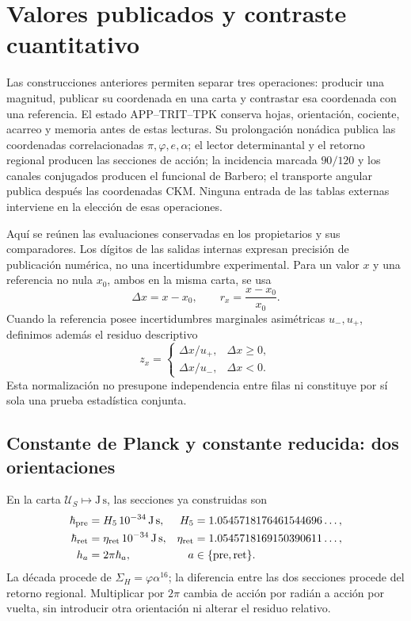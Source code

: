 \section{Valores publicados y contraste cuantitativo}
\label{sec:ii-contraste-cuantitativo}

Las construcciones anteriores permiten separar tres operaciones:
producir una magnitud, publicar su coordenada en una carta y contrastar esa
coordenada con una referencia. El estado APP--TRIT--TPK conserva hojas,
orientación, cociente, acarreo y memoria antes de estas lecturas. Su
prolongación nonádica publica las coordenadas correlacionadas
\(\pi,\varphi,e,\alpha\); el lector determinantal y el retorno regional
producen las secciones de acción; la incidencia marcada \(90/120\) y
los canales conjugados producen el funcional de Barbero; el transporte
angular publica después las coordenadas CKM. Ninguna entrada de las tablas
externas interviene en la elección de esas operaciones.

Aquí se reúnen las evaluaciones conservadas en los propietarios y sus
comparadores. Los dígitos de las salidas internas expresan precisión de
publicación numérica, no una incertidumbre experimental. Para un valor
\(x\) y una referencia no nula \(x_0\), ambos en la misma carta, se usa
\[
 \Delta x=x-x_0,\qquad r_x=\frac{x-x_0}{x_0}.
\]
Cuando la referencia posee incertidumbres marginales asimétricas
\(u_-,u_+\), definimos además el residuo descriptivo
\begin{equation}
 z_x=\begin{cases}
 \Delta x/u_+,&\Delta x\geq0,\\
 \Delta x/u_-,&\Delta x<0.
 \end{cases}
 \label{eq:ii-residuo-marginal}
\end{equation}
Esta normalización no presupone independencia entre filas ni constituye
por sí sola una prueba estadística conjunta.

\subsection{Constante de Planck y constante reducida: dos orientaciones}

En la carta \(\mathcal U_S\mapsto\mathrm{J\,s}\), las secciones ya
construidas son
\begin{align}
 \hbar_{\rm pre}&=H_5\,10^{-34}\,\mathrm{J\,s},&
 H_5&=1.0545718176461544696\ldots,\\
 \hbar_{\rm ret}&=\eta_{\rm ret}\,10^{-34}\,\mathrm{J\,s},&
 \eta_{\rm ret}&=1.0545718169150390611\ldots,\\
 h_a&=2\pi\hbar_a,&a&\in\{\mathrm{pre},\mathrm{ret}\}.
 \label{eq:ii-cuatro-coordenadas-planck}
\end{align}
La década procede de \(\Sigma_H=\varphi\alpha^{16}\); la diferencia entre
las dos secciones procede del retorno regional. Multiplicar por \(2\pi\)
cambia de acción por radián a acción por vuelta, sin introducir otra
orientación ni alterar el residuo relativo.

